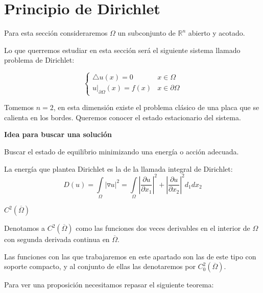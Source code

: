 \documentclass[openany]{book}
\begin{document}
\section{Principio de Dirichlet}

\noindent Para esta sección consideraremos $ \Omega $ un subconjunto de $ \mathbb{R}^{n} $ abierto y acotado.

Lo que querremos estudiar en esta sección será el siguiente sistema llamado problema de Dirichlet:

$$ \left\{
\begin{array}{ll}
    \triangle u(x) = 0 & x \in \Omega\\
    u|_{\partial \Omega}(x) = f(x) & x \in \partial \Omega 
\end{array}
\right. $$

\begin{example}
    Tomemos $ n = 2 $, en esta dimensión existe el problema clásico de una placa que se calienta en los bordes. Queremos conocer el estado estacionario del sistema.
\end{example}

\begin{flushright}
    \textbf{Idea para buscar una solución}
\end{flushright}

Buscar el estado de equilibrio minimizando una energía o acción adecuada.

La energía que plantea Dirichlet es la de la llamada integral de Dirichlet:
$$ D(u) = \int\limits_{\Omega}^{}|\triangledown u | ^2 = \int\limits_{\Omega}^{} | \dfrac{\partial u}{\partial x_1}|^2 + | \dfrac{\partial u}{\partial x_2}|^2 d_1dx_2 $$

\begin{definition}
    $ C^2(\overline{\Omega}) $

    Denotamos a $ C^2(\overline{\Omega}) $ como las funciones dos veces derivables en el interior de $ \Omega $ con segunda derivada continua en $ \overline{\Omega} $.

    Las funciones con las que trabajaremos en este apartado son las de este tipo con soporte compacto, y al conjunto de ellas las denotaremos por $ C_0^2(\overline{\Omega }) $.
\end{definition}

Para ver una proposición necesitamos repasar el siguiente teorema:

\end{document}
